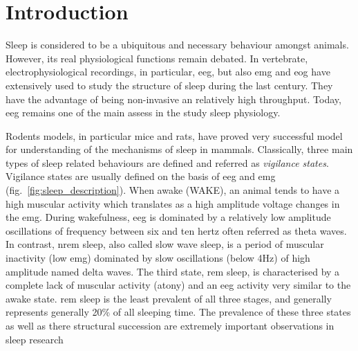 \section{Introduction} \label{intro}

Sleep is considered to be a ubiquitous and necessary behaviour amongst animals.
However, its real physiological functions remain debated.
In vertebrate, electrophysiological recordings, in particular, \gls{eeg},
but also \gls{emg} and \gls{eog} have extensively used to study the structure of sleep during the last century.
They have the advantage of being non-invasive an relatively high throughput.
Today, \gls{eeg} remains one of the main assess in the study sleep physiology.

Rodents models, in particular mice and rats, have proved very successful model for understanding of the mechanisms of sleep in mammals.
Classically, three main types of sleep related behaviours are defined and referred as \emph{vigilance states}.
Vigilance states are usually defined on the basis of \gls{eeg} and \gls{emg} (fig.~\ref{fig:sleep_description}).
When awake (WAKE), an animal tends to have a high muscular activity which translates as a high amplitude voltage changes in the \gls{emg}.
During wakefulness, \gls{eeg} is dominated by a relatively low amplitude oscillations of frequency
between six and ten hertz often referred as theta waves.
In contrast, \gls{nrem} sleep, also called slow wave sleep, is a period of muscular inactivity (low \gls{emg})
dominated by slow oscillations (below 4Hz) of high amplitude named delta waves.
The third state, \gls{rem} sleep, is characterised by a complete lack of muscular activity (atony) and an \gls{eeg} activity very similar to the awake state.
\gls{rem} sleep is the least prevalent of all three stages, and generally represents generally  20\% of all sleeping time.
The prevalence of these three states as well as there structural succession are extremely important observations in sleep research





